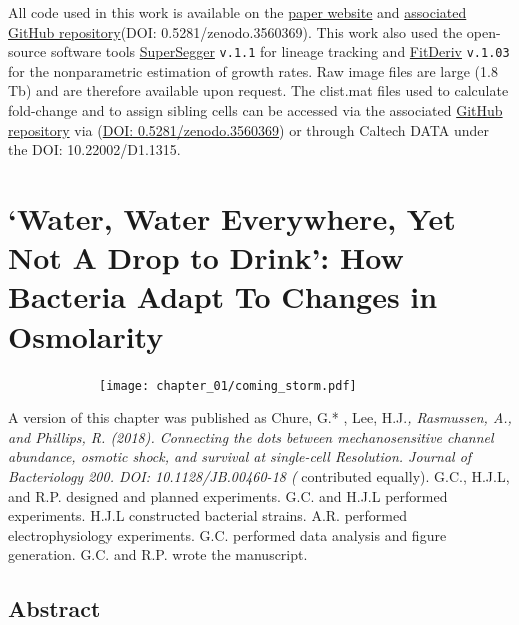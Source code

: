 \documentclass[12pt]{caltech_thesis}
\begin{document}
All code used in this work is available on the
\href{https://github.com/rpgroup-pboc/mwc_growth}{paper website} and
\href{https://www.github.com/rpgroup-pboc/mwc_growth}{associated GitHub
repository}(DOI: 0.5281/zenodo.3560369). This work also used the
open-source software tools
\href{http://mtshasta.phys.washington.edu/website/SuperSegger.php}{SuperSegger}
\texttt{v.1.1}\autocite{stylianidou2016,cass2017} for lineage tracking
and \href{http://swainlab.bio.ed.ac.uk/software/fitderiv/}{FitDeriv}
\texttt{v.1.03} \autocite{swain2016} for the nonparametric estimation of
growth rates. Raw image files are large (1.8 Tb) and are therefore
available upon request. The clist.mat files used to calculate
fold-change and to assign sibling cells can be accessed via the
associated \href{https://github.com/rpgroup-pboc/mwc_growth}{GitHub
repository} via (\href{http://doi.org/10.5281/zenodo.3560369}{DOI:
0.5281/zenodo.3560369}) or through Caltech DATA under the DOI:
10.22002/D1.1315.

\hypertarget{water-water-everywhere-yet-not-a-drop-to-drink-how-bacteria-adapt-to-changes-in-osmolarity}{%
\chapter{`Water, Water Everywhere, Yet Not A Drop to Drink': How
Bacteria Adapt To Changes in
Osmolarity}\label{water-water-everywhere-yet-not-a-drop-to-drink-how-bacteria-adapt-to-changes-in-osmolarity}}

~~~~~~~~~~~~~\texttt{[image: chapter\_01/coming\_storm.pdf]}

A version of this chapter was published as Chure, G.* , Lee, H.J.\emph{,
Rasmussen, A., and Phillips, R. (2018). Connecting the dots between
mechanosensitive channel abundance, osmotic shock, and survival at
single-cell Resolution. Journal of Bacteriology 200. DOI:
10.1128/JB.00460-18 (} contributed equally). G.C., H.J.L, and R.P.
designed and planned experiments. G.C. and H.J.L performed experiments.
H.J.L constructed bacterial strains. A.R. performed electrophysiology
experiments. G.C. performed data analysis and figure generation. G.C.
and R.P. wrote the manuscript.

\hypertarget{abstract-3}{%
\section{Abstract}\label{abstract-3}}
\end{document}
